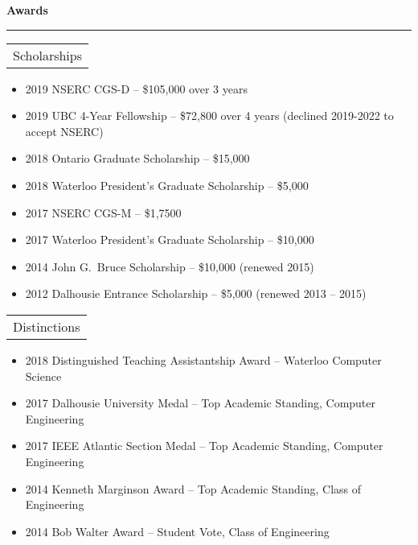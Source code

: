 \documentclass{article}
\newcommand{\heading}[1]
{
	\vspace{3pt}
	\textbf{#1} 
	\vspace{-6pt}
	
	\rule{\linewidth}{0.4pt}
}
\begin{document}
\heading{Awards}
\begin{tabularx}{\textwidth}{X}
    Scholarships \\
\end{tabularx}
\begin{itemize}
\item 2019 NSERC CGS-D -- \$105,000 over 3 years
\item 2019 UBC 4-Year Fellowship -- \$72,800 over 4 years (declined 2019-2022 to accept NSERC)
\item 2018 Ontario Graduate Scholarship -- \$15,000
\item 2018 Waterloo President's Graduate Scholarship -- \$5,000
\item 2017 NSERC CGS-M -- \$1,7500
\item 2017 Waterloo President's Graduate Scholarship -- \$10,000
\item 2014 John G.~Bruce Scholarship -- \$10,000 (renewed 2015)
\item 2012 Dalhousie Entrance Scholarship -- \$5,000 (renewed 2013 -- 2015)
\end{itemize}
\begin{tabularx}{\textwidth}{X}
    Distinctions \\
\end{tabularx}
\begin{itemize}
\item 2018 Distinguished Teaching Assistantship Award -- Waterloo Computer Science
\item 2017 Dalhousie University Medal -- Top Academic Standing, Computer Engineering
\item 2017 IEEE Atlantic Section Medal -- Top Academic Standing, Computer Engineering
\item 2014 Kenneth Marginson Award -- Top Academic Standing, Class of Engineering
\item 2014 Bob Walter Award -- Student Vote, Class of Engineering 
\end{itemize}

\clearpage
\end{document}
